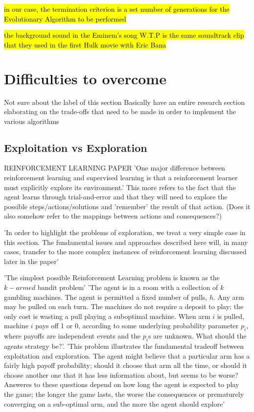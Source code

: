 \hl{in our case, the termination criterion is a set number of generations for the Evolutionary Algorithm to be performed}


\hl{the background sound in the Eminem's song W.T.P is the same soundtrack clip that they used in the first Hulk movie with Eric Bana}



\section{Difficulties to overcome}
Not sure about the label of this section
Basically have an entire research section elaborating on the trade-offs that need to be made in order to implement the various algorithms

\subsection{Exploitation vs Exploration} REINFORCEMENT LEARNING PAPER \cite{KaelblingLittmanMoore1996}
'One major difference between reinforcement learning and supervised learning is that a reinforcement learner must explicitly explore its environment.' \cite{KaelblingLittmanMoore1996}
This more refers to the fact that the agent learns through trial-and-error and that they will need to explore the possible steps/actions/solutions and 'remember' the result of that action. (Does it also somehow refer to the mappings between actions and consequences?)

'In order to highlight the problems of exploration, we treat a very simple case in this section. The fundamental issues and approaches described here will, in many cases, transfer to the more complex instances of reinforcement learning discussed later in the paper' \cite{KaelblingLittmanMoore1996}

'The simplest possible Reinforcement Learning problem is known as the $k-armed$ bandit problem' \cite{KaelblingLittmanMoore1996}
'The agent is in a room with a collection of $k$ gambling machines. The agent is permitted a fixed number of pulls, $h$. Any arm may be pulled on each turn. The machines do not require a deposit to play; the only cost is wasting a pull playing a suboptimal machine. When arm $i$ is pulled, machine $i$ pays off 1 or 0, according to some underlying probability parameter $p_i$, where payoffs are independent events and the $p_i$s are unknown. What should the agents strategy be?'\cite{KaelblingLittmanMoore1996}.
'This problem illustrates the fundamental tradeoff between exploitation and exploration. The agent might believe that a particular arm has a fairly high payoff probability; should it choose that arm all the time, or should it choose another one that it has less information about, but seems to be worse? Answeres to these questions depend on how long the agent is expected to play the game; the longer the game lasts, the worse the consequences or prematurely converging on a sub-optimal arm, and the more the agent should explore'



